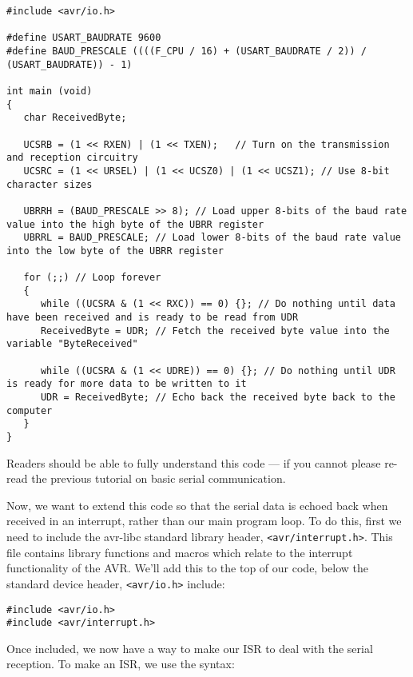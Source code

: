 \documentclass[a4paper,oneside,notitlepage]{book}
\begin{document}
\begin{center}
\begin{lstlisting}
#include <avr/io.h>

#define USART_BAUDRATE 9600
#define BAUD_PRESCALE ((((F_CPU / 16) + (USART_BAUDRATE / 2)) / (USART_BAUDRATE)) - 1)

int main (void)
{
   char ReceivedByte;

   UCSRB = (1 << RXEN) | (1 << TXEN);   // Turn on the transmission and reception circuitry
   UCSRC = (1 << URSEL) | (1 << UCSZ0) | (1 << UCSZ1); // Use 8-bit character sizes

   UBRRH = (BAUD_PRESCALE >> 8); // Load upper 8-bits of the baud rate value into the high byte of the UBRR register
   UBRRL = BAUD_PRESCALE; // Load lower 8-bits of the baud rate value into the low byte of the UBRR register

   for (;;) // Loop forever
   {
      while ((UCSRA & (1 << RXC)) == 0) {}; // Do nothing until data have been received and is ready to be read from UDR
      ReceivedByte = UDR; // Fetch the received byte value into the variable "ByteReceived"

      while ((UCSRA & (1 << UDRE)) == 0) {}; // Do nothing until UDR is ready for more data to be written to it
      UDR = ReceivedByte; // Echo back the received byte back to the computer
   }
}
\end{lstlisting}
\end{center}

Readers should be able to fully understand this code --- if you cannot please re-read the previous tutorial on basic serial communication.

Now, we want to extend this code so that the serial data is echoed back when received in an interrupt, rather than our main program loop. To do this, first we need to include the avr-libc standard library header, \texttt{<avr/interrupt.h>}. This file contains library functions and macros which relate to the interrupt functionality of the AVR. We'll add this to the top of our code, below the standard device header, \texttt{<avr/io.h>}  include:

\begin{center}
\begin{lstlisting}
#include <avr/io.h>
#include <avr/interrupt.h>
\end{lstlisting}
\end{center}

Once included, we now have a way to make our ISR to deal with the serial reception. To make an ISR, we use the syntax:
\end{document}
